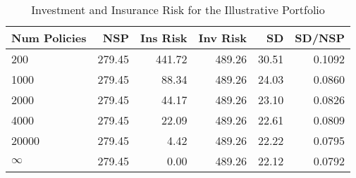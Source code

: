 \begin{table}[!htpb]
\centering
\begingroup\small
\begin{tabular}{lrrrrr}
  \hline
Num Policies & NSP & Ins Risk & Inv Risk & SD & SD/NSP \\ 
  \hline
200 & 279.45 & 441.72 & 489.26 & 30.51 & 0.1092 \\ 
  1000 & 279.45 & 88.34 & 489.26 & 24.03 & 0.0860 \\ 
  2000 & 279.45 & 44.17 & 489.26 & 23.10 & 0.0826 \\ 
  4000 & 279.45 & 22.09 & 489.26 & 22.61 & 0.0809 \\ 
  20000 & 279.45 & 4.42 & 489.26 & 22.22 & 0.0795 \\ 
  $\infty$ & 279.45 & 0.00 & 489.26 & 22.12 & 0.0792 \\ 
   \hline
\end{tabular}
\endgroup
\caption{Investment and Insurance Risk for the Illustrative Portfolio} 
\label{tab:risktableAR1}
\end{table}


